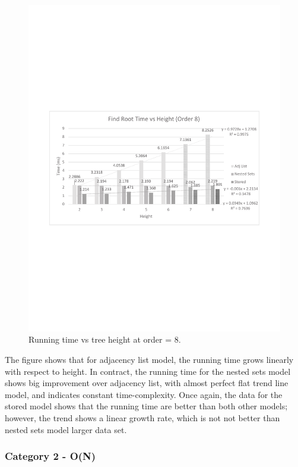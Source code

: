 \begin{figure}[!h]
\begin{center}
\includegraphics[width=6in]{images/height.pdf}
\caption{Running time vs tree height at order = 8.\label{fig-time-height}}
\end{center}
\end{figure}

The figure shows that for adjacency list model, the running time grows linearly with respect to height. In contract, the running time for the nested sets model shows big improvement over adjacency list, with almost perfect flat trend line model, and indicates constant time-complexity. Once again, the data for the stored model shows that the running time are better than both other models; however, the trend shows a linear growth rate, which is not not better than nested sets model larger data set.


\subsubsection{Category 2 - O(N)}\label{eval_group2}

